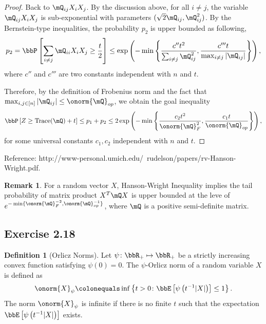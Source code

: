 \documentclass[11pt]{article}
\DeclareMathOperator{\tr}{Trace}
\newcommand{\of}[1]{\left(#1\right)}
\newcommand{\off}[1]{\left[#1\right]}
\newcommand{\offf}[1]{\left\{#1\right\}}
\theoremstyle{plain}
\theoremstyle{definition}
\newtheorem{defn}{Definition}
\newtheorem{rmk}{Remark}
\begin{document}
\begin{proof}
    	\vspace{0.2cm}
    	Back to $\mQ_{ij} X_i X_j$. By the discussion above, for all $i\neq j$, the variable $\mQ_{ij} X_i X_j$ is sub-exponential with parameters $(\sqrt{2} \mQ_{ij}, \mQ_{ij}^2)$. By the Bernstein-type inequalities, the probability $p_2$ is upper bounded as following,
    	\begin{equation}
    		p_2 = \bbP \off{ \sum_{i \neq j} \mQ_{ii} X_i X_j  \geq \frac{t}{2}} \leq \exp \of{ - \min \offf{  \frac{c'' t^2}{\sum_{i\neq j} \mQ^2_{ij} }, \frac{c'''t}{\max_{i\neq j   }|\mQ_{ij}| } }},
    	\end{equation}
    	where $c''$ and $c'''$ are two constants independent with $n$ and $t$.
    	
    	\vspace{0.2cm}
    	
    	Therefore, by the definition of Frobenius norm and the fact that $\max_{i,j\in[n]}|\mQ_{ij}| \leq \onorm{\mQ}_{op} $, we obtain the goal inequality
    	\begin{equation}
    		\bbP \off{ Z \geq \tr(\mQ) +  t } \leq p_1 + p_2 \leq 2\exp \of{ - \min \offf{  \frac{c_2 t^2}{\onorm{\mQ}^2_F}, \frac{c_1t}{\onorm{\mQ}_{op} }} },
    	\end{equation}
    	for some universal constants $c_1,c_2$ independent with $n$ and $t$.
    \end{proof}
    
    Reference: http://www-personal.umich.edu/~rudelson/papers/rv-Hanson-Wright.pdf.
    
    \begin{rmk}
    	For a random vector $X$, Hanson-Wright Inequality implies the tail probability of matrix product $X^T \mQ X$ is upper bounded at the leve of $e^{-\min\{ \onorm{\mQ}^{-2}_F, \onorm{\mQ}^{-1}_{op} \}}$, where $\mQ$ is a positive semi-definite matrix. 
    \end{rmk}
    
    
    \subsection{Exercise 2.18}
    
    \begin{defn}[Orlicz Norms]\label{def:orlicz}
     Let $\psi \colon \bbR_+ \mapsto \bbR_+$ be a strictly increasing convex function satisfying $\psi(0) = 0$. The $\psi$-Orlicz norm of a random variable $X$ is defined as
    \begin{equation}
    	\onorm{X}_{\psi} \colonequals \inf \offf{t > 0\colon \bbE\off{\psi \of{t^{-1} |X| } } \leq 1  }.
    \end{equation}
    The norm $\onorm{X}_{\psi}$ is infinite if there is no finite $t$ such that the expectation $ \bbE\off{\psi \of{t^{-1} |X| } }$ exists.
    \end{defn}
    
\end{document}
